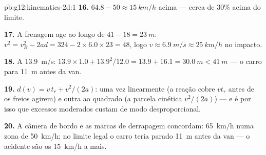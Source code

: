 \begin{solution}{pb:g12:kinematics-2d:1}
\textbf{16.} $64.8 - 50 \approx \qty{15}{km/h}$ acima --- cerca de
$30\%$ acima do limite.

\textbf{17.} A frenagem age ao longo de $41 - 18 = \qty{23}{m}$:
$v^2 = v_B^2 - 2ad = 324 - 2 \times 6.0 \times 23 = 48$, logo
$v \approx \qty{6.9}{m/s} \approx \qty{25}{km/h}$ no impacto.

\textbf{18.} A \qty{13.9}{m/s}:
$13.9 \times 1.0 + 13.9^2/12.0 = 13.9 + 16.1 = \qty{30.0}{m} <
\qty{41}{m}$ --- o carro para \qty{11}{m} antes da van.

\textbf{19.} $d(v) = v\,t_r + v^2/(2a)$: uma vez linearmente (a reação
cobre $v t_r$ antes de os freios agirem) e outra ao quadrado (a parcela
cinética $v^2/(2a)$) --- e é por isso que excessos moderados custam de
modo desproporcional.

\textbf{20.} A câmera de bordo e as marcas de derrapagem concordam:
\qty{65}{km/h} numa zona de \qty{50}{km/h}; no limite legal o carro teria
parado \qty{11}{m} antes da van --- o acidente são os \qty{15}{km/h} a
mais.
\end{solution}
